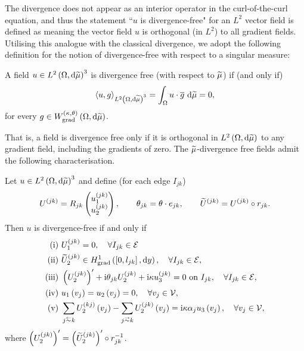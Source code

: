 The divergence does not appear as an interior operator in the curl-of-the-curl equation, and thus the statement ``$u$ is divergence-free" for an $L^2$ vector field is defined as meaning the vector field $u$ is orthogonal (in $L^2$) to all gradient fields.
Utilising this analogue with the classical divergence, we adopt the following definition for the notion of divergence-free with respect to a singular measure:
\begin{definition} \label{def:DivFree-AllGradients}
	A field $u\in L^{2}\left( \Omega,\mathrm{d} \widetilde{\mu} \right)^3$ is divergence free (with respect to $\widetilde{\mu}$) if (and only if)
	\begin{align*}
		\left\langle u , g \right\rangle_{L^{2}\left( \Omega,\mathrm{d} \widetilde{\mu} \right)^3} = \int_{\Omega} u\cdot\overline{g}  \ \mathrm{d}\widetilde{\mu} = 0,
	\end{align*}
	for every $g\in W_{\mathrm{grad}}^{\left( \kappa, \theta \right)}\left( \Omega,\mathrm{d}\widetilde{\mu} \right)$.
\end{definition}
That is, a field is divergence free only if it is orthogonal in $L^{2}\left( \Omega,\mathrm{d} \widetilde{\mu} \right)$ to any gradient field, including the gradients of zero.
The $\widetilde{\mu}$-divergence free fields admit the following characterisation.
\begin{prop} \label{prop:DivFree-AllGradsConditions}
	Let $u\in L^{2}\left( \Omega,\mathrm{d} \widetilde{\mu} \right)^3$ and define (for each edge $I_{jk}$)
	\begin{align*}
		U^{(jk)} = R_{jk}\begin{pmatrix} u_1^{(jk)} \\ u_2^{(jk)} \end{pmatrix}, 
		\qquad \theta_{jk} = \theta\cdot e_{jk}, 
		\qquad \widetilde{U}^{(jk)} = U^{(jk)}\circ r_{jk}.
	\end{align*}		
	Then $u$ is divergence-free if and only if
	\begin{align*}
		\mathrm{(i)} \ & U_1^{(jk)} = 0, \quad \forall I_{jk}\in\edgeSet \\
		\mathrm{(ii)} \ & \widetilde{U}_2^{(jk)}\in\gradSob{\sqbracs{0,l_{jk}}}{y}, \quad \forall I_{jk}\in\edgeSet, \\
		\mathrm{(iii)} \ & \bracs{U_2^{(jk)}}' + \rmi\qm_{jk}U_2^{(jk)} + \rmi\wavenumber u_3^{(jk)} = 0 \text{ on } I_{jk}, \quad \forall I_{jk}\in\edgeSet, \\
		\mathrm{(iv)} \ & u_1\bracs{v_j} = u_2\bracs{v_j} = 0, \quad \forall v_j\in\vertSet, \\
		\mathrm{(v)} \ & \sum_{j\conRight k}U_2^{(kj)}\bracs{v_j} - \sum_{j\conLeft k}U_2^{(jk)}\bracs{v_j} = \rmi\wavenumber\alpha_j u_3\bracs{v_j}, \quad \forall v_j\in\vertSet,
	\end{align*}
	where $\left( U_2^{(jk)} \right)' = \left( \widetilde{U}_2^{(jk)} \right)'\circ r_{jk}^{-1}$.
\end{prop}
